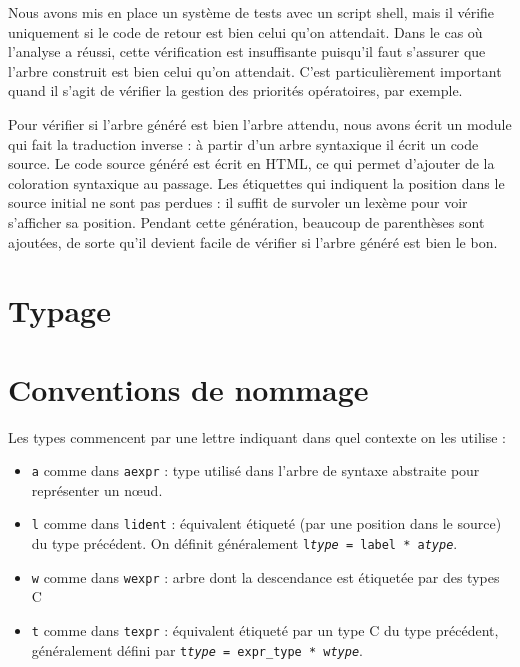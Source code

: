 \documentclass[a4paper]{article}
\begin{document}
Nous avons mis en place un système de tests avec un script shell, mais il vérifie uniquement si le code de retour est bien celui qu'on attendait.
Dans le cas où l'analyse a réussi, cette vérification est insuffisante puisqu'il faut s'assurer que l'arbre construit est bien celui qu'on attendait.
C'est particulièrement important quand il s'agit de vérifier la gestion des priorités opératoires, par exemple.

Pour vérifier si l'arbre généré est bien l'arbre attendu, nous avons écrit un module qui fait la traduction inverse :
à partir d'un arbre syntaxique il écrit un code source.
Le code source généré est écrit en HTML, ce qui permet d'ajouter de la coloration syntaxique au passage.
Les étiquettes qui indiquent la position dans le source initial ne sont pas perdues :
il suffit de survoler un lexème pour voir s'afficher sa position.
Pendant cette génération, beaucoup de parenthèses sont ajoutées, de sorte qu'il devient facile de vérifier si l'arbre généré est bien le bon.

\section{Typage}

\appendix
\section{Conventions de nommage}

Les types commencent par une lettre indiquant dans quel contexte on les utilise :
\begin{itemize}
    \item \texttt{a} comme dans \texttt{aexpr} : type utilisé dans l'arbre de syntaxe abstraite pour représenter un nœud.
    \item \texttt{l} comme dans \texttt{lident} : équivalent étiqueté (par une position dans le source) du type précédent.
    On définit généralement \texttt{l\emph{type} = label * a\emph{type}}.
\item \texttt{w} comme dans \texttt{wexpr} : arbre dont la descendance est étiquetée par des types C
\item \texttt{t} comme dans \texttt{texpr} : équivalent étiqueté par un type C du type précédent, généralement défini par \texttt{t\emph{type} = expr\_type * w\emph{type}}.
\end{itemize}
\end{document}
